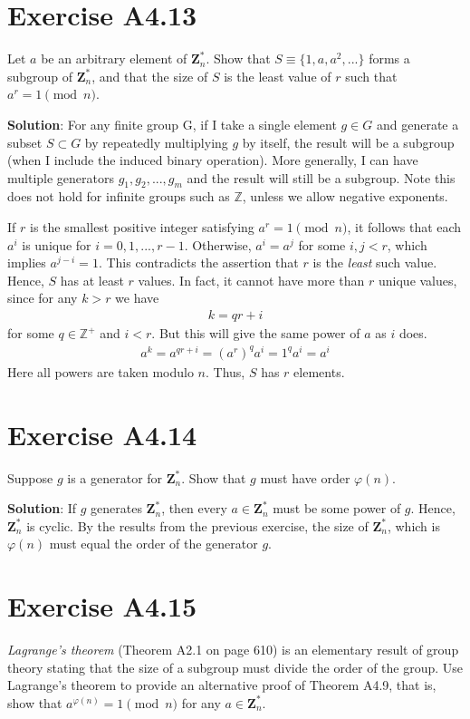 \documentclass{book}
\begin{document}
\section*{Exercise A4.13}
    Let $a$ be an arbitrary element of $\textbf{Z}_n^*$. Show that $S\equiv \{1,a,a^2,...\}$ forms a subgroup of $\textbf{Z}_n^*$, and that the size of $S$ is the least value of $r$ such that $a^r = 1\pmod{n}$.
    
    \textbf{Solution}: For any finite group G, if I take a single element $g\in G$ and generate a subset $S \subset G$ by repeatedly multiplying $g$ by itself, the result will be a subgroup (when I include the induced binary operation). More generally, I can have multiple generators $g_1, g_2, ..., g_m$ and the result will still be a subgroup. Note this does not hold for infinite groups such as $\mathbb{Z}$, unless we allow negative exponents.
    
    If $r$ is the smallest positive integer satisfying $a^r = 1\pmod{n}$, it follows that each $a^i$ is unique for $i=0,1,...,r-1$. Otherwise, $a^i = a^j$ for some $i,j <r$, which implies $a^{j-i}=1$. This contradicts the assertion that $r$ is the \emph{least} such value. Hence, $S$ has at least $r$ values. In fact, it cannot have more than $r$ unique values, since for any $k>r$ we have
    \begin{align}
        k = qr + i
    \end{align}
    for some $q\in\mathbb{Z}^+$ and $i<r$. But this will give the same power of $a$ as $i$ does.
    \begin{align}
        a^k = a^{qr + i} = (a^r)^q a^i = 1^q a^i = a^i
    \end{align}
    Here all powers are taken modulo $n$. Thus, $S$ has $r$ elements. 

\section*{Exercise A4.14}
    Suppose $g$ is a generator for $\textbf{Z}_n^*$. Show that $g$ must have order $\varphi(n)$.
    
    \textbf{Solution}: If $g$ generates $\textbf{Z}_n^*$, then every $a\in \textbf{Z}_n^*$ must be some power of $g$. Hence, $\textbf{Z}_n^*$ is cyclic. By the results from the previous exercise, the size of $\textbf{Z}_n^*$, which is $\varphi(n)$ must equal the order of the generator $g$.

\section*{Exercise A4.15}
    \emph{Lagrange's theorem} (Theorem A2.1 on page 610) is an elementary result of group theory stating that the size of a subgroup must divide the order of the group. Use Lagrange's theorem to provide an alternative proof of Theorem A4.9, that is, show that $a^{\varphi(n)}=1\pmod{n}$ for any $a\in \textbf{Z}_n^*$.
    
\end{document}
